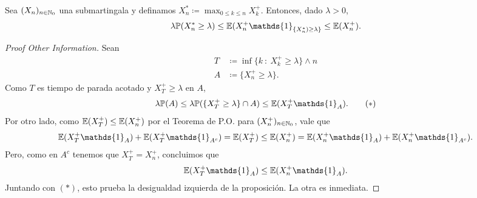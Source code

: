 \begin{prop}
	Sea $(X_{n})_{n \in \mathbb{N}_{0}}$ una submartingala y definamos $X_{n}^{*} \coloneq \max_{0 \leq k \leq n} X_{k}^{+}$. Entonces, dado $\lambda > 0$,
	\[ \lambda \mbb{P}(X_{n}^{*} \geq \lambda) \leq \mbb{E}(X_{n}^{+} \mathds{1}_{\{X_{n}^{*}) \geq \lambda\}} \leq \mbb{E}(X_{n}^{+}). \]
\end{prop}
\begin{proof}[Proof Other Information]
	Sean
	\begin{align*}
		T &\coloneq \inf \{k \ : \ X_{k}^{+} \geq \lambda\} \wedge n \\
		A &\coloneq \{X_{n}^{+} \geq \lambda\} 
	.\end{align*}
	Como $T$ es tiempo de parada acotado y $X_{T}^{+} \geq \lambda$ en $A$,
	\[ \lambda \mbb{P}(A) \leq \lambda \mbb{P}(\{X_{T}^{+} \geq \lambda\} \cap A) \leq \mbb{E}(X_{T}^{+} \mathds{1}_{A}). \tag{$*$}\]
	Por otro lado, como $\mathbb{E}(X_{T}^{+}) \leq \mathbb{E}(X_{n}^{+})$ por el Teorema de P.O. para $(X_{n}^{+})_{n \in \mathbb{N}_{0}}$, vale que
	\[ \mbb{E}(X_{T}^{+} \mathds{1}_{A}) + \mbb{E}(X_{T}^{+} \mathds{1}_{A^{c}}) = \mbb{E}(X_{T}^{+}) \leq \mbb{E}(X_{n}^{+}) = \mbb{E}(X_{n}^{+} \mathds{1}_{A}) + \mbb{E}(X_{n}^{+} \mathds{1}_{A^{c}}). \]
	Pero, como en $A^{c}$ tenemos que $X_{T}^{+} = X_{n}^{+}$, concluimos que 
	\[ \mbb{E}(X_{T}^{+} \mathds{1}_{A}) \leq \mbb{E}(X_{n}^{+} \mathds{1}_{A}). \]
	Juntando con $(*)$, esto prueba la desigualdad izquierda de la proposición. La otra es inmediata.
\end{proof}

